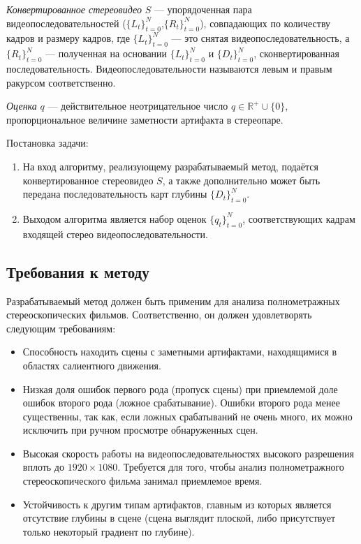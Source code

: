 \documentclass[14pt, a4paper]{extarticle}
\begin{document}
\textit{Конвертированное стереовидео} $𝑆$ --- упорядоченная пара видеопоследовательностей 
($\{L_t\}_{t=0}^N$,$\{R_t\}_{t=0}^N$), совпадающих по количеству кадров и размеру кадров, 
где $\{L_t\}_{t=0}^N$ --- это снятая видеопоследовательность, а $\{R_t\}_{t=0}^N$ --- 
полученная на основании $\{L_t\}_{t=0}^N$ и $\{D_t\}_{t=0}^N$, сконвертированная последовательность. 
Видеопоследовательности называются левым и правым ракурсом соответственно.

\textit{Оценка} $q$ --- действительное неотрицательное число $q \in \mathbb{R}^{+} \cup \{0\}$, 
пропорциональное величине заметности артифакта в стереопаре.

Постановка задачи:

\begin{enumerate}
	\item На вход алгоритму, реализующему разрабатываемый метод, подаётся конвертированное стереовидео $𝑆$, а также дополнительно может быть передана последовательность карт глубины $\{D_t\}_{t=0}^N$.
	\item Выходом алгоритма является набор оценок $\{q_t\}_{t=0}^N$, соответствующих кадрам входящей стерео видеопоследовательности.
\end{enumerate}

\subsection{Требования к методу}

Разрабатываемый метод должен быть применим для анализа полнометражных стереоскопических фильмов. Соответственно, он должен удовлетворять следующим требованиям:

\begin{itemize}
	\item Способность находить сцены с заметными артифактами, 
	находящимися в областях салиентного движения.
	\item Низкая доля ошибок первого рода (пропуск сцены) при приемлемой доле 
	ошибок второго рода (ложное срабатывание). Ошибки второго рода менее существенны, 
	так как, если ложных срабатываний не очень много, их можно исключить 
	при ручном просмотре обнаруженных сцен.
	\item Высокая скорость работы на видеопоследовательностях высокого разрешения 
	вплоть до $1920 \times 1080$. Требуется для того, чтобы анализ 
	полнометражного стереоскопического фильма занимал приемлемое время.
	\item Устойчивость к другим типам артифактов, главным из которых является отсутствие глубины в сцене (сцена выглядит плоской, либо присутствует только некоторый градиент по глубине).
\end{itemize}
\end{document}
